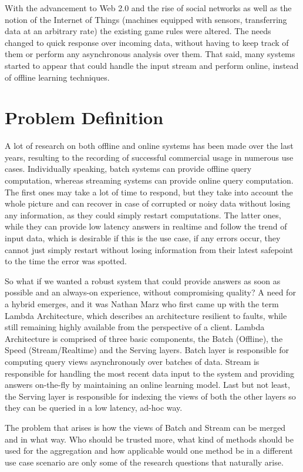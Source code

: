 \documentclass{lmproj}
\begin{document}
With the advancement to Web 2.0 and the rise of social networks as well as the notion of the Internet of Things (machines equipped with sensors, transferring data at an arbitrary rate) the existing game rules were altered. The needs changed to quick response over incoming data, without having to keep track of them or perform any asynchronous analysis over them. That said, many systems started to appear that could handle the input stream and perform online, instead of offline learning techniques. 

\section{Problem Definition}
\label{intro}

A lot of research on both offline and online systems has been made over the last years, resulting to the recording of successful commercial usage in numerous use cases. Individually speaking, batch systems can provide offline query computation, whereas streaming systems can provide online query computation. The first ones may take a lot of time to respond, but they take into account the whole picture and can recover in case of corrupted or noisy data without losing any information, as they could simply restart computations. The latter ones, while they can provide low latency answers in realtime and follow the trend of input data, which is desirable if this is the use case, if any errors occur, they cannot just simply restart without losing information from their latest safepoint to the time the error was spotted.

So what if we wanted a robust system that could provide answers as soon as possible and an always-on experience, without compromising quality? A need for a hybrid emerges, and it was Nathan Marz who first came up with the term Lambda Architecture, which describes an architecture resilient to faults, while still remaining highly available from the perspective of a client. Lambda Architecture is comprised of three basic components, the Batch (Offline), the Speed (Stream/Realtime) and the Serving layers. Batch layer is responsible for computing query views asynchronously over batches of data. Stream is responsible for handling the most recent data input to the system and providing answers on-the-fly by maintaining an online learning model. Last but not least, the Serving layer is responsible for indexing the views of both the other layers so they can be queried in a low latency, ad-hoc way.

The problem that arises is how the views of Batch and Stream can be merged and in what way. Who should be trusted more, what kind of methods should be used for the aggregation and how applicable would one method be in a different use case scenario are only some of the research questions that naturally arise. 
\end{document}
